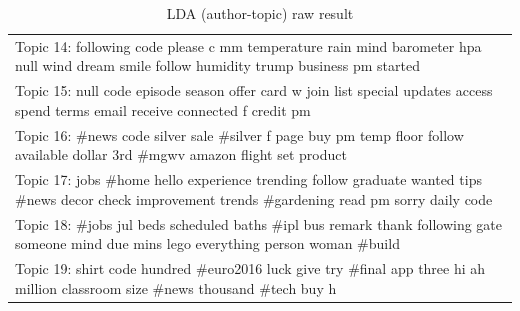 \documentclass[11pt]{article}
\begin{document}
\begin{appendices}
\begin{table}
\begin{tabular}{|p{\linewidth}|}
    Topic 14: following code please c mm temperature rain mind barometer hpa null wind dream smile follow humidity trump business pm started\\
    Topic 15: null code episode season offer card w join list special updates access spend terms email receive connected f credit pm\\
    Topic 16: \#news code silver sale \#silver f page buy pm temp floor follow available dollar 3rd \#mgwv amazon flight set product\\
    Topic 17: jobs \#home hello experience trending follow graduate wanted tips \#news decor check improvement trends \#gardening read pm sorry daily code\\
    Topic 18: \#jobs jul beds scheduled baths \#ipl bus remark thank following gate someone mind due mins lego everything person woman \#build\\
    Topic 19: shirt code hundred \#euro2016 luck give try \#final app three hi ah million classroom size \#news thousand \#tech buy h\\
    \hline
    \end{tabular}
	\caption{LDA (author-topic) raw result}
	\label{tb:res_lda_grp_raw}
\end{table}


\end{appendices}
\end{document}
